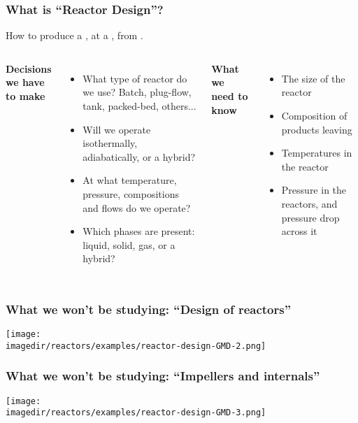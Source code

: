 \begin{frame}\frametitle{What is ``Reactor Design''?}
	\begin{exampleblock}{}
		How to produce a {\color{purple}{specified product}}, at a {\color{orange}{given rate}}, from {\color{myGreen}{known reactants}}.
	\end{exampleblock}
	\vspace{12pt}
	\begin{columns}[t]
			\textbf{Decisions we have to make}
			\begin{itemize}
				\item	What type of reactor do we use? Batch, plug-flow, tank, packed-bed, others...
				\item	Will we operate isothermally, adiabatically, or a hybrid?
				\item	At what temperature, pressure, compositions and flows do we operate?
				\item	Which phases are present: liquid, solid, gas, or a hybrid?
			\end{itemize}

			\textbf{What we need to know}
			\begin{itemize}
				\item	The size of the reactor
				\item	Composition of products leaving
				\item	Temperatures in the reactor
				\item	Pressure in the reactors, and pressure drop across it
			\end{itemize}
	\end{columns}
\end{frame}

\begin{frame}\frametitle{What we won't be studying: ``Design of reactors''}
	\begin{center}
		\texttt{[image: \\imagedir/reactors/examples/reactor-design-GMD-2.png]}
	\end{center}
	\vspace{-12pt}
\end{frame}

\begin{frame}\frametitle{What we won't be studying: ``Impellers and internals''}
	\begin{center}
		\texttt{[image: \\imagedir/reactors/examples/reactor-design-GMD-3.png]}
	\end{center}
\end{frame}

